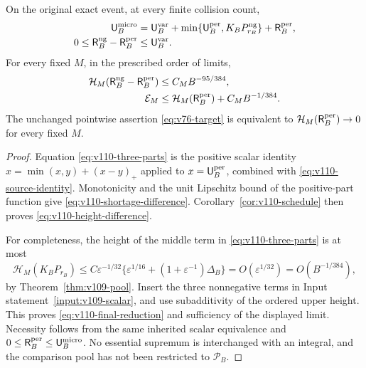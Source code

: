 \begin{theorem}
\label{thm:v110-residual}
On the original exact event, at every finite collision count,
\begin{align}
 \mathsf U_B^{\rm micro}
  &=\mathsf U_B^{\rm var}
    +\min\{\mathsf U_B^{\rm per},K_BP_{r_B}^{\rm ng}\}
    +\mathsf R_B^{\rm per},\label{eq:v110-three-parts}\\
 0\le\mathsf R_B^{\rm ng}-\mathsf R_B^{\rm per}
  &\le\mathsf U_B^{\rm var}.\label{eq:v110-shortage-difference}
\end{align}
For every fixed $M$, in the prescribed order of limits,
\begin{align}
 \mathcal H_M(\mathsf R_B^{\rm ng}-\mathsf R_B^{\rm per})
     &\le C_MB^{-95/384},\label{eq:v110-height-difference}\\
 \mathcal E_M&\le\mathcal H_M(\mathsf R_B^{\rm per})
                           +C_MB^{-1/384}.
                           \label{eq:v110-final-reduction}
\end{align}
The unchanged pointwise assertion \eqref{eq:v76-target} is equivalent
to $\mathcal H_M(\mathsf R_B^{\rm per})\to0$ for every fixed $M$.
\end{theorem}
\begin{proof}
Equation \eqref{eq:v110-three-parts} is the positive scalar identity
$x=\min(x,y)+(x-y)_+$ applied to $x=\mathsf U_B^{\rm per}$,
combined with \eqref{eq:v110-source-identity}. Monotonicity and the
unit Lipschitz bound of the positive-part function give
\eqref{eq:v110-shortage-difference}. Corollary~\ref{cor:v110-schedule}
then proves \eqref{eq:v110-height-difference}.

For completeness, the height of the middle term in
\eqref{eq:v110-three-parts} is at most
\[
 \mathcal H_M(K_BP_{r_B})
 \le C\varepsilon^{-1/32}
       \{\varepsilon^{1/16}+(1+\varepsilon^{-1})\Delta_B\}
 =O(\varepsilon^{1/32})=O(B^{-1/384}),
\]
by Theorem~\ref{thm:v109-pool}. Insert the three nonnegative terms
in Input statement~\ref{input:v109-scalar}, and use subadditivity
of the ordered upper height. This proves
\eqref{eq:v110-final-reduction} and sufficiency of the displayed
limit. Necessity follows from the same inherited scalar equivalence
and $0\le\mathsf R_B^{\rm per}\le\mathsf U_B^{\rm micro}$.
No essential supremum is interchanged with an integral, and the
comparison pool has not been restricted to $\mathcal P_B$.
\end{proof}

